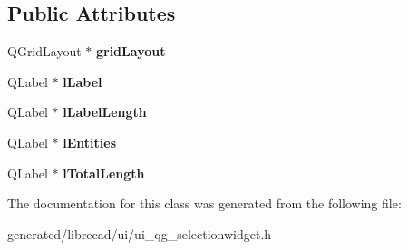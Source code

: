 \subsection*{Public Attributes}
\begin{DoxyCompactItemize}
\item 
\hypertarget{classUi__QG__SelectionWidget_a7942bbedb4ee52bfd8b8a456ba67475e}{Q\-Grid\-Layout $\ast$ {\bfseries grid\-Layout}}\label{classUi__QG__SelectionWidget_a7942bbedb4ee52bfd8b8a456ba67475e}

\item 
\hypertarget{classUi__QG__SelectionWidget_a36a3f96293516c695a8297c337c4e8af}{Q\-Label $\ast$ {\bfseries l\-Label}}\label{classUi__QG__SelectionWidget_a36a3f96293516c695a8297c337c4e8af}

\item 
\hypertarget{classUi__QG__SelectionWidget_a9a3cff9b500dd70a628ba11a721a7c82}{Q\-Label $\ast$ {\bfseries l\-Label\-Length}}\label{classUi__QG__SelectionWidget_a9a3cff9b500dd70a628ba11a721a7c82}

\item 
\hypertarget{classUi__QG__SelectionWidget_acd89b642d4019e3a6b3d2c3452518df7}{Q\-Label $\ast$ {\bfseries l\-Entities}}\label{classUi__QG__SelectionWidget_acd89b642d4019e3a6b3d2c3452518df7}

\item 
\hypertarget{classUi__QG__SelectionWidget_a616aa9b028de1f05b1c4ab3a2db8c403}{Q\-Label $\ast$ {\bfseries l\-Total\-Length}}\label{classUi__QG__SelectionWidget_a616aa9b028de1f05b1c4ab3a2db8c403}

\end{DoxyCompactItemize}


The documentation for this class was generated from the following file\-:\begin{DoxyCompactItemize}
\item 
generated/librecad/ui/ui\-\_\-qg\-\_\-selectionwidget.\-h\end{DoxyCompactItemize}
